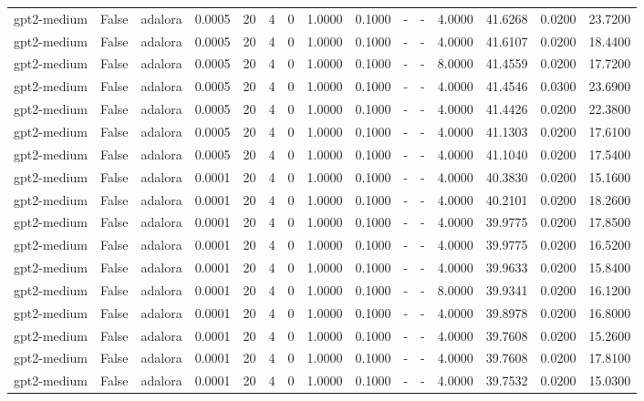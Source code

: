 \begin{tabular}{lrlrrrrrrlllrrr}
gpt2-medium & False & adalora & 0.0005 & 20 & 4 & 0 & 1.0000 & 0.1000 & - & - & 4.0000 & 41.6268 & 0.0200 & 23.7200 \\
gpt2-medium & False & adalora & 0.0005 & 20 & 4 & 0 & 1.0000 & 0.1000 & - & - & 4.0000 & 41.6107 & 0.0200 & 18.4400 \\
gpt2-medium & False & adalora & 0.0005 & 20 & 4 & 0 & 1.0000 & 0.1000 & - & - & 8.0000 & 41.4559 & 0.0200 & 17.7200 \\
gpt2-medium & False & adalora & 0.0005 & 20 & 4 & 0 & 1.0000 & 0.1000 & - & - & 4.0000 & 41.4546 & 0.0300 & 23.6900 \\
gpt2-medium & False & adalora & 0.0005 & 20 & 4 & 0 & 1.0000 & 0.1000 & - & - & 4.0000 & 41.4426 & 0.0200 & 22.3800 \\
gpt2-medium & False & adalora & 0.0005 & 20 & 4 & 0 & 1.0000 & 0.1000 & - & - & 4.0000 & 41.1303 & 0.0200 & 17.6100 \\
gpt2-medium & False & adalora & 0.0005 & 20 & 4 & 0 & 1.0000 & 0.1000 & - & - & 4.0000 & 41.1040 & 0.0200 & 17.5400 \\
gpt2-medium & False & adalora & 0.0001 & 20 & 4 & 0 & 1.0000 & 0.1000 & - & - & 4.0000 & 40.3830 & 0.0200 & 15.1600 \\
gpt2-medium & False & adalora & 0.0001 & 20 & 4 & 0 & 1.0000 & 0.1000 & - & - & 4.0000 & 40.2101 & 0.0200 & 18.2600 \\
gpt2-medium & False & adalora & 0.0001 & 20 & 4 & 0 & 1.0000 & 0.1000 & - & - & 4.0000 & 39.9775 & 0.0200 & 17.8500 \\
gpt2-medium & False & adalora & 0.0001 & 20 & 4 & 0 & 1.0000 & 0.1000 & - & - & 4.0000 & 39.9775 & 0.0200 & 16.5200 \\
gpt2-medium & False & adalora & 0.0001 & 20 & 4 & 0 & 1.0000 & 0.1000 & - & - & 4.0000 & 39.9633 & 0.0200 & 15.8400 \\
gpt2-medium & False & adalora & 0.0001 & 20 & 4 & 0 & 1.0000 & 0.1000 & - & - & 8.0000 & 39.9341 & 0.0200 & 16.1200 \\
gpt2-medium & False & adalora & 0.0001 & 20 & 4 & 0 & 1.0000 & 0.1000 & - & - & 4.0000 & 39.8978 & 0.0200 & 16.8000 \\
gpt2-medium & False & adalora & 0.0001 & 20 & 4 & 0 & 1.0000 & 0.1000 & - & - & 4.0000 & 39.7608 & 0.0200 & 15.2600 \\
gpt2-medium & False & adalora & 0.0001 & 20 & 4 & 0 & 1.0000 & 0.1000 & - & - & 4.0000 & 39.7608 & 0.0200 & 17.8100 \\
gpt2-medium & False & adalora & 0.0001 & 20 & 4 & 0 & 1.0000 & 0.1000 & - & - & 4.0000 & 39.7532 & 0.0200 & 15.0300 \\

\end{tabular}
